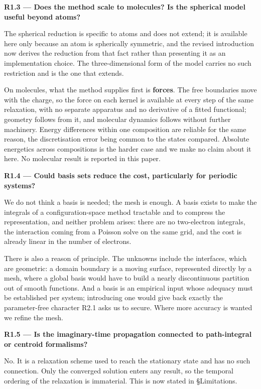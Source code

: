 \documentclass[11pt,a4paper]{article}
\begin{document}
\textbf{R1.3 --- Does the method scale to molecules? Is the spherical model useful beyond atoms?}

The spherical reduction is specific to atoms and does not extend; it is available here only
because an atom is spherically symmetric, and the revised introduction now derives the
reduction from that fact rather than presenting it as an implementation choice. The
three-dimensional form of the model carries no such restriction and is the one that extends.

On molecules, what the method supplies first is \textbf{forces}. The free boundaries move with the
charge, so the force on each kernel is available at every step of the same relaxation, with no
separate apparatus and no derivative of a fitted functional; geometry follows from it, and
molecular dynamics follows without further machinery. Energy differences within one composition
are reliable for the same reason, the discretisation error being common to the states compared.
Absolute energetics across compositions is the harder case and we make no claim about it here.
No molecular result is reported in this paper.

\textbf{R1.4 --- Could basis sets reduce the cost, particularly for periodic systems?}

We do not think a basis is needed; the mesh is enough. A basis exists to make the integrals of
a configuration-space method tractable and to compress the representation, and neither problem
arises: there are no two-electron integrals, the interaction coming from a Poisson solve on the
same grid, and the cost is already linear in the number of electrons.

There is also a reason of principle. The unknowns include the interfaces, which are geometric: a
domain boundary is a moving surface, represented directly by a mesh, where a global basis would
have to build a nearly discontinuous partition out of smooth functions. And a basis is an
empirical input whose adequacy must be established per system; introducing one would give back
exactly the parameter-free character R2.1 asks us to secure. Where more accuracy is wanted we
refine the mesh.

\textbf{R1.5 --- Is the imaginary-time propagation connected to path-integral or centroid formalisms?}

No. It is a relaxation scheme used to reach the stationary state and has no such connection.
Only the converged solution enters any result, so the temporal ordering of the relaxation is
immaterial. This is now stated in §Limitations.
\end{document}

